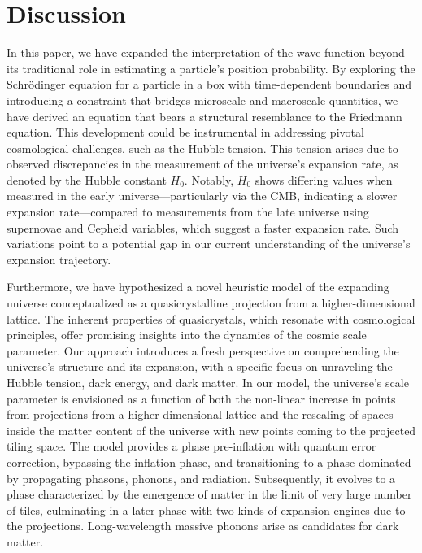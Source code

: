 \documentclass{article}
\begin{document}
\section{Discussion}
\label{sec:conclusion}

In this paper, we have expanded the interpretation of the wave function beyond its traditional role in estimating a particle's position probability. By exploring the Schr{\"o}dinger equation for a particle in a box with time-dependent boundaries and introducing a constraint that bridges microscale and macroscale quantities, we have derived an equation that bears a structural resemblance to the Friedmann equation. This development could be instrumental in addressing pivotal cosmological challenges, such as the Hubble tension. This tension arises due to observed discrepancies in the measurement of the universe's expansion rate, as denoted by the Hubble constant $H_0$. Notably, $H_0$ shows differing values when measured in the early universe—particularly via the CMB, indicating a slower expansion rate—compared to measurements from the late universe using supernovae and Cepheid variables, which suggest a faster expansion rate. Such variations point to a potential gap in our current understanding of the universe's expansion trajectory.

Furthermore, we have hypothesized a novel heuristic model of the expanding universe conceptualized as a quasicrystalline projection from a higher-dimensional lattice. The inherent properties of quasicrystals, which resonate with cosmological principles, offer promising insights into the dynamics of the cosmic scale parameter. Our approach introduces a fresh perspective on comprehending the universe's structure and its expansion, with a specific focus on unraveling the Hubble tension, dark energy, and dark matter. In our model, the universe's scale parameter is envisioned as a function of both the non-linear increase in points from projections from a higher-dimensional lattice and the rescaling of spaces inside the matter content of the universe with new points coming to the projected tiling space. The model provides a phase pre-inflation with quantum error correction, bypassing the inflation phase, and transitioning to a phase dominated by propagating phasons, phonons, and radiation. Subsequently, it evolves to a phase characterized by the emergence of matter in the limit of very large number of tiles, culminating in a later phase with two kinds of expansion engines due to the projections. Long-wavelength massive phonons arise as candidates for dark matter.
\end{document}
